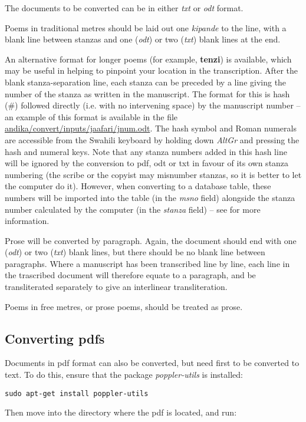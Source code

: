 The documents to be converted can be in either \textit{txt} or \textit{odt} format.

Poems in traditional metres should be laid out one \textit{kipande} to the line, with a blank line between stanzas and one (\textit{odt}) or two (\textit{txt}) blank lines at the end.

An alternative format for longer poems (for example, \textbf{tenzi}) is available, which may be useful in helping to pinpoint your location in the transcription.  After the blank stanza-separation line, each stanza can be preceded by a line giving the number of the stanza as written in the manuscript.  The format for this is hash (\#) followed directly (i.e. with no intervening space) by the manuscript number -- an example of this format is available in the file \url{andika/convert/inputs/jaafari/jnum.odt}.  The hash symbol and Roman numerals are accessible from the Swahili keyboard by holding down \textit{AltGr} and pressing the hash and numeral keys.   Note that any stanza numbers added in this hash line will be ignored by the conversion to pdf, odt or txt in favour of its own stanza numbering (the scribe or the copyist may misnumber stanzas, so it is better to let the computer do it).  However, when converting to a database table, these numbers will be imported into the table (in the \textit{msno} field) alongside the stanza number calculated by the computer (in the \textit{stanza} field) -- see  for more information.

Prose will be converted by paragraph.  Again, the document should end with one (\textit{odt}) or two (\textit{txt}) blank lines, but there should be no blank line between paragraphs.  Where a manuscript has been transcribed line by line, each line in the trascribed document will therefore equate to a paragraph, and be transliterated separately to give an interlinear transliteration.

Poems in free metres, or prose poems, should be treated as prose.

\subsection{Converting pdfs}

Documents in pdf format can also be converted, but need first to be converted to text.  To do this, ensure that the package \textit{poppler-utils} is installed:

\verb|sudo apt-get install poppler-utils|

Then move into the directory where the pdf is located, and run:

